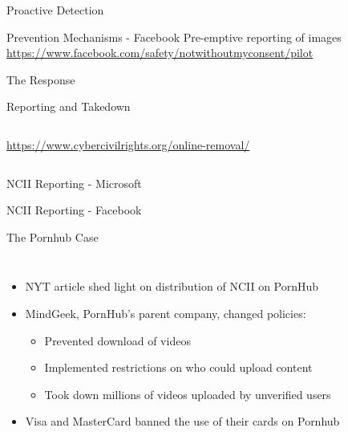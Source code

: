 \documentclass[nobackground,dvipsnames,table,aspectratio=169]{beamer}
\begin{document}
\begin{frame}{Proactive Detection}
\end{frame}

\begin{frame}{Prevention Mechanisms - Facebook}
    \centering
    Pre-emptive reporting of images
    \url{https://www.facebook.com/safety/notwithoutmyconsent/pilot}
\end{frame}

\begin{frame}{The Response}
\end{frame}

\begin{frame}{Reporting and Takedown}
    \begin{columns}
            \url{https://www.cybercivilrights.org/online-removal/}
    \end{columns}
\end{frame}

\begin{frame}{NCII Reporting - Microsoft}
\end{frame}

\begin{frame}{NCII Reporting - Facebook}
\end{frame}

\begin{frame}{The Pornhub Case}
    \begin{columns}
            \begin{itemize}
                \item NYT article shed light on distribution of NCII on PornHub
                \item MindGeek, PornHub’s parent company, changed policies:
                \begin{itemize}
                    \item Prevented download of videos
                    \item Implemented restrictions on who could upload content
                    \item Took down millions of videos uploaded by unverified users
                \end{itemize}
                \item Visa and MasterCard banned the use of their cards on Pornhub
            \end{itemize}
    \end{columns}
\end{frame}
\end{document}
